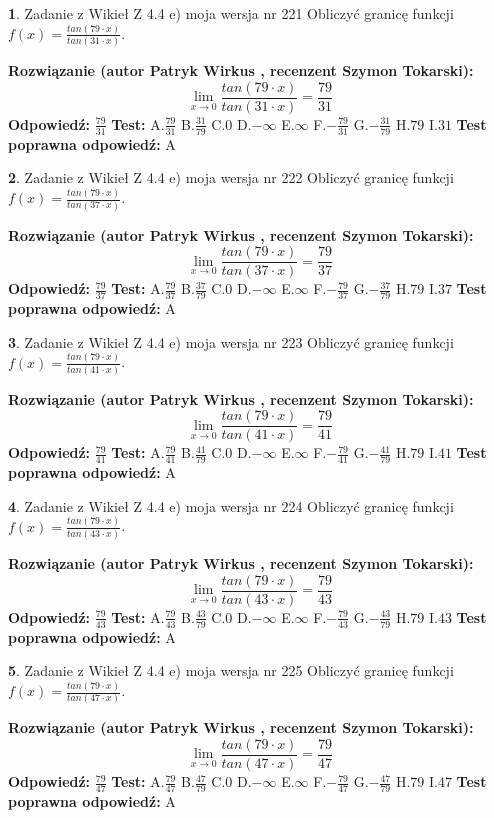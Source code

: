 \documentclass[12pt, a4paper]{article}
\theoremstyle{definition} %
\newtheorem{zad}{}
\newcommand{\zadStart}[1]{\begin{zad}#1\newline}
\newcommand{\zadStop}{\end{zad}}
\newcommand{\rozwStart}[2]{\noindent \textbf{Rozwiązanie (autor #1 , recenzent #2): }\newline}
\newcommand{\rozwStop}{\newline}
\newcommand{\odpStart}{\noindent \textbf{Odpowiedź:}\newline}
\newcommand{\odpStop}{\newline}
\newcommand{\testStart}{\noindent \textbf{Test:}\newline}
\newcommand{\testStop}{\newline}
\newcommand{\kluczStart}{\noindent \textbf{Test poprawna odpowiedź:}\newline}
\newcommand{\kluczStop}{\newline}
\begin{document}
\zadStart{Zadanie z Wikieł Z 4.4 e) moja wersja nr 221}
Obliczyć granicę funkcji $f(x)=\frac{tan(79\cdot x)}{tan(31\cdot x)}$.
\zadStop
\rozwStart{Patryk Wirkus}{Szymon Tokarski}
$$\lim\limits_{x\to 0}\frac{tan(79\cdot x)}{tan(31\cdot x)}=
\frac{79}{31}$$
\rozwStop
\odpStart
$\frac{79}{31}$
\odpStop
\testStart
A.$\frac{79}{31}$
B.$\frac{31}{79}$
C.$0$
D.$-\infty$
E.$\infty$
F.$-\frac{79}{31}$
G.$-\frac{31}{79}$
H.$79$
I.$31$
\testStop
\kluczStart
A
\kluczStop



\zadStart{Zadanie z Wikieł Z 4.4 e) moja wersja nr 222}
Obliczyć granicę funkcji $f(x)=\frac{tan(79\cdot x)}{tan(37\cdot x)}$.
\zadStop
\rozwStart{Patryk Wirkus}{Szymon Tokarski}
$$\lim\limits_{x\to 0}\frac{tan(79\cdot x)}{tan(37\cdot x)}=
\frac{79}{37}$$
\rozwStop
\odpStart
$\frac{79}{37}$
\odpStop
\testStart
A.$\frac{79}{37}$
B.$\frac{37}{79}$
C.$0$
D.$-\infty$
E.$\infty$
F.$-\frac{79}{37}$
G.$-\frac{37}{79}$
H.$79$
I.$37$
\testStop
\kluczStart
A
\kluczStop



\zadStart{Zadanie z Wikieł Z 4.4 e) moja wersja nr 223}
Obliczyć granicę funkcji $f(x)=\frac{tan(79\cdot x)}{tan(41\cdot x)}$.
\zadStop
\rozwStart{Patryk Wirkus}{Szymon Tokarski}
$$\lim\limits_{x\to 0}\frac{tan(79\cdot x)}{tan(41\cdot x)}=
\frac{79}{41}$$
\rozwStop
\odpStart
$\frac{79}{41}$
\odpStop
\testStart
A.$\frac{79}{41}$
B.$\frac{41}{79}$
C.$0$
D.$-\infty$
E.$\infty$
F.$-\frac{79}{41}$
G.$-\frac{41}{79}$
H.$79$
I.$41$
\testStop
\kluczStart
A
\kluczStop



\zadStart{Zadanie z Wikieł Z 4.4 e) moja wersja nr 224}
Obliczyć granicę funkcji $f(x)=\frac{tan(79\cdot x)}{tan(43\cdot x)}$.
\zadStop
\rozwStart{Patryk Wirkus}{Szymon Tokarski}
$$\lim\limits_{x\to 0}\frac{tan(79\cdot x)}{tan(43\cdot x)}=
\frac{79}{43}$$
\rozwStop
\odpStart
$\frac{79}{43}$
\odpStop
\testStart
A.$\frac{79}{43}$
B.$\frac{43}{79}$
C.$0$
D.$-\infty$
E.$\infty$
F.$-\frac{79}{43}$
G.$-\frac{43}{79}$
H.$79$
I.$43$
\testStop
\kluczStart
A
\kluczStop



\zadStart{Zadanie z Wikieł Z 4.4 e) moja wersja nr 225}
Obliczyć granicę funkcji $f(x)=\frac{tan(79\cdot x)}{tan(47\cdot x)}$.
\zadStop
\rozwStart{Patryk Wirkus}{Szymon Tokarski}
$$\lim\limits_{x\to 0}\frac{tan(79\cdot x)}{tan(47\cdot x)}=
\frac{79}{47}$$
\rozwStop
\odpStart
$\frac{79}{47}$
\odpStop
\testStart
A.$\frac{79}{47}$
B.$\frac{47}{79}$
C.$0$
D.$-\infty$
E.$\infty$
F.$-\frac{79}{47}$
G.$-\frac{47}{79}$
H.$79$
I.$47$
\testStop
\kluczStart
A
\kluczStop
\end{document}
